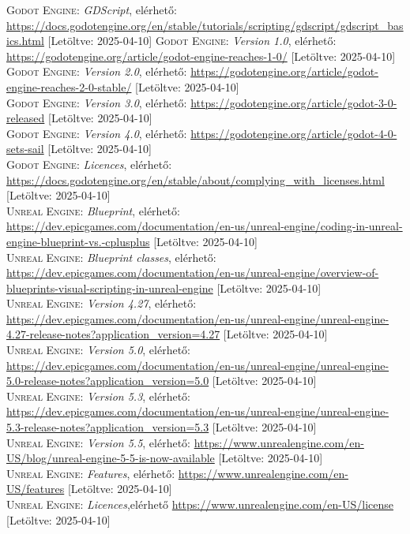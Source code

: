 \documentclass[
]{thesis-ekf}
\theoremstyle{definition}
\theoremstyle{remark}
\begin{document}
\begin{thebibliography}{2}
\textsc{Godot Engine}: \emph{GDScript}, elérhető:
\url{https://docs.godotengine.org/en/stable/tutorials/scripting/gdscript/gdscript_basics.html} [Letöltve: 2025-04-10]
\textsc{Godot Engine}: \emph{Version 1.0}, elérhető:
\url{https://godotengine.org/article/godot-engine-reaches-1-0/} [Letöltve: 2025-04-10]\\
\textsc{Godot Engine}: \emph{Version 2.0}, elérhető:
\url{https://godotengine.org/article/godot-engine-reaches-2-0-stable/} [Letöltve: 2025-04-10]\\
\textsc{Godot Engine}: \emph{Version 3.0}, elérhető:
\url{https://godotengine.org/article/godot-3-0-released} [Letöltve: 2025-04-10]\\
\textsc{Godot Engine}: \emph{Version 4.0}, elérhető:
\url{https://godotengine.org/article/godot-4-0-sets-sail} [Letöltve: 2025-04-10]\\
\textsc{Godot Engine}: \emph{Licences}, elérhető:
\url{https://docs.godotengine.org/en/stable/about/complying_with_licenses.html} [Letöltve: 2025-04-10]\\

\textsc{Unreal Engine}: \emph{Blueprint}, elérhető:
\url{https://dev.epicgames.com/documentation/en-us/unreal-engine/coding-in-unreal-engine-blueprint-vs.-cplusplus} [Letöltve: 2025-04-10]\\
\textsc{Unreal Engine}: \emph{Blueprint classes}, elérhető:
\url{https://dev.epicgames.com/documentation/en-us/unreal-engine/overview-of-blueprints-visual-scripting-in-unreal-engine} [Letöltve: 2025-04-10]\\
\textsc{Unreal Engine}: \emph{Version 4.27}, elérhető:
\url{https://dev.epicgames.com/documentation/en-us/unreal-engine/unreal-engine-4.27-release-notes?application_version=4.27} [Letöltve: 2025-04-10]\\
\textsc{Unreal Engine}: \emph{Version 5.0}, elérhető:
\url{https://dev.epicgames.com/documentation/en-us/unreal-engine/unreal-engine-5.0-release-notes?application_version=5.0} [Letöltve: 2025-04-10]\\
\textsc{Unreal Engine}: \emph{Version 5.3}, elérhető:
\url{https://dev.epicgames.com/documentation/en-us/unreal-engine/unreal-engine-5.3-release-notes?application_version=5.3} [Letöltve: 2025-04-10]\\
\textsc{Unreal Engine}: \emph{Version 5.5}, elérhető:
\url{https://www.unrealengine.com/en-US/blog/unreal-engine-5-5-is-now-available} [Letöltve: 2025-04-10]\\
\textsc{Unreal Engine}: \emph{Features}, elérhető:
\url{https://www.unrealengine.com/en-US/features} [Letöltve: 2025-04-10]\\
\textsc{Unreal Engine}: \emph{Licences},elérhető
\url{https://www.unrealengine.com/en-US/license} [Letöltve: 2025-04-10]\\


\end{thebibliography}
\end{document}
